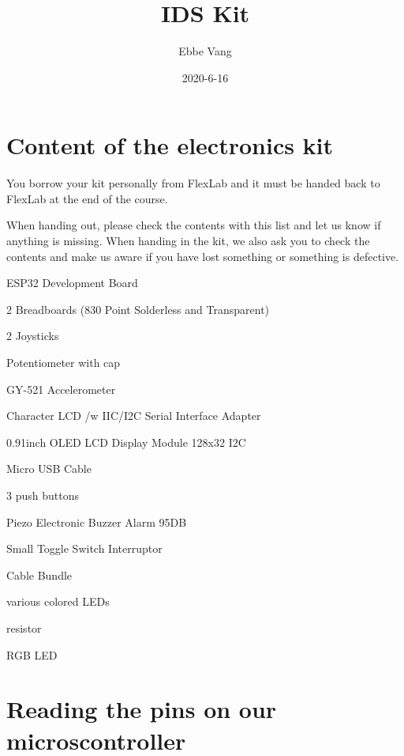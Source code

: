 \documentclass[12pt, a4paper]{article}
\date{2020-6-16}
\author{Ebbe Vang}
\title{IDS Kit}
\begin{document}
\section{Content of the electronics kit}  

You borrow your kit personally from FlexLab and it must be handed back to
FlexLab at the end of the course.

When handing out, please check the contents with this list and
let us know if anything is missing. When handing in the kit, we also ask
you to check the contents and make us aware if you
have lost something or something is defective.
\begin{todolist}
  \item ESP32 Development Board
  \item 2 Breadboards (830 Point Solderless and Transparent)
  \item 2 Joysticks
  \item Potentiometer with cap
  \item GY-521 Accelerometer 
  \item Character LCD /w IIC/I2C Serial Interface Adapter
  \item 0.91inch OLED LCD Display Module 128x32 I2C 
  \item Micro USB Cable
  \item 3 push buttons
  \item Piezo Electronic Buzzer Alarm 95DB
  \item Small Toggle Switch Interruptor
  \item Cable Bundle
  \item various colored LEDs
  \item resistor
  \item RGB LED
\end{todolist}




\newpage
\section{Reading the pins on our microscontroller}
\end{document}
